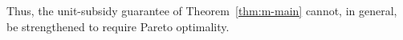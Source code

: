 Thus, the unit-subsidy guarantee of Theorem~\ref{thm:m-main} cannot, in general, be strengthened to require Pareto optimality.

